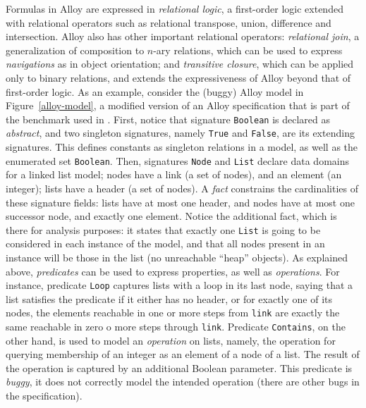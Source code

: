 Formulas in Alloy are expressed in \emph{relational logic}, a first-order logic extended with relational operators such as relational transpose, union, difference and intersection. Alloy also has other important relational operators: \emph{relational join}, a generalization of  composition to $n$-ary relations, which can be used to express \emph{navigations} as in object orientation; and \emph{transitive closure}, which can be applied only to binary relations, and extends the expressiveness of Alloy beyond that of first-order logic. As an example, consider the (buggy) Alloy model in Figure~\ref{alloy-model}, a modified version of an Alloy specification that is part of the benchmark used in \cite{Wang+2019}. First, notice that signature \texttt{Boolean} is declared as \emph{abstract}, and two singleton signatures, namely \texttt{True} and \texttt{False}, are its extending signatures. This defines constants as singleton relations in a model, as well as the enumerated set \texttt{Boolean}. Then, signatures \texttt{Node} and \texttt{List} declare data domains for a linked list model; nodes have a link (a set of nodes), and an element (an integer); lists have a header (a set of nodes). A \emph{fact} constrains the cardinalities of these signature fields: lists have at most one header, and nodes have at most one successor node, and exactly one element. Notice the additional fact, which is there for analysis purposes: it states that exactly one \texttt{List} is going to be considered in each instance of the model, and that all nodes present in an instance will be those in the list (no unreachable ``heap'' objects). As explained above, \emph{predicates} can be used to express properties, as well as \emph{operations}. For instance, predicate \texttt{Loop} captures lists with a loop in its last node, saying that a list satisfies the predicate if it either has no header, or for exactly one of its nodes, the elements reachable in one or more steps from \texttt{link} are exactly the same reachable in zero o more steps through \texttt{link}. Predicate \texttt{Contains}, on the other hand, is used to model an \emph{operation} on lists, namely, the operation for querying membership of an integer as an element of a node of a list. The result of the operation is captured by an additional Boolean parameter. This predicate is \emph{buggy}, it does not correctly model the intended operation (there are other bugs in the specification). 

